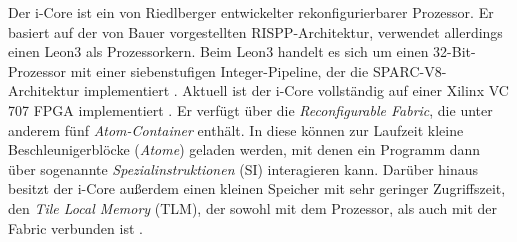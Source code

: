 Der i-Core ist ein von Riedlberger \cite{riedlberger2013} entwickelter rekonfigurierbarer Prozessor.
Er basiert auf der von Bauer \cite{Bauer2009} vorgestellten RISPP-Architektur, verwendet allerdings einen Leon3 als Prozessorkern.
Beim Leon3 handelt es sich um einen 32-Bit-Prozessor mit einer siebenstufigen Integer-Pipeline, der die SPARC-V8-Architektur implementiert \cite{leon3}.
Aktuell ist der i-Core vollständig auf einer Xilinx VC 707 FPGA implementiert \cite{riedlberger2015}.
Er verfügt über die \textit{Reconfigurable Fabric}, die unter anderem fünf \textit{Atom-Container} enthält.
In diese können zur Laufzeit kleine Beschleunigerblöcke (\textit{Atome}) geladen werden, mit denen ein Programm dann über
sogenannte \textit{Spezialinstruktionen} (SI) interagieren kann. Darüber hinaus besitzt der i-Core außerdem einen kleinen
Speicher mit sehr geringer Zugriffszeit, den \textit{Tile Local Memory} (TLM), der sowohl mit dem Prozessor, als auch mit der Fabric verbunden ist \cite{riedlberger2013}.


